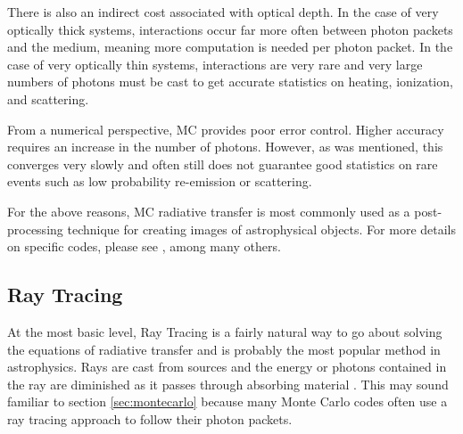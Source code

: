 There is also an indirect cost associated with optical depth. In the case of very optically thick systems, interactions occur far more often between photon packets and the medium, meaning more computation is needed per photon packet. In the case of very optically thin systems, interactions are very rare and very large numbers of photons must be cast to get accurate statistics on heating, ionization, and scattering. 

From a numerical perspective, MC provides poor error control. Higher accuracy requires an increase in the number of photons. However, as was mentioned, this converges very slowly and often still does not guarantee good statistics on rare events such as low probability re-emission or scattering.

For the above reasons, MC radiative transfer is most commonly used as a post-processing technique for creating images of astrophysical objects. For more details on specific codes, please see \citet{dullemond12,cantalupoPorciani11,altayEt08,ercolanoEt03,nenkovaEt99,lucy99,harriesHowarth97}, among many others.




\subsection{Ray Tracing}
\label{sec:raytracing}

At the most basic level, Ray Tracing is a fairly natural way to go about solving the equations of radiative transfer and is probably the most popular method in astrophysics. Rays are cast from sources and the energy or photons contained in the ray are diminished as it passes through absorbing material \citep{altayTheuns13,rosdahlEt13,altayEt08,rijkhorstEt06,abelWandelt02,razoumovScott99,abelNormanMadau99}. This may sound familiar to section \ref{sec:montecarlo} because many Monte Carlo codes often use a ray tracing approach to follow their photon packets.

